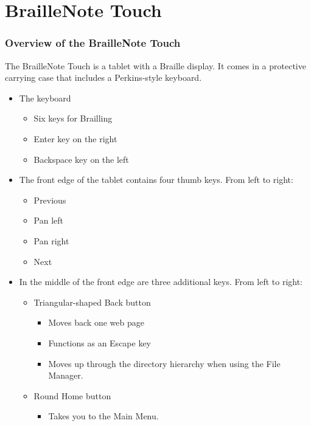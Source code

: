 \documentclass[10pt,letterpaper,twoside]{report}
\begin{document}
{{{\part{BrailleNote Touch}

\section{Overview of the BrailleNote Touch}

The BrailleNote Touch is a tablet with a Braille display. It comes in a protective carrying case that includes a Perkins-style keyboard.
\begin{itemize}
	\item The keyboard
	\begin{itemize}
		\item Six keys for Brailling
		\item Enter key on the right
		\item Backspace key on the left
	\end{itemize}
	\item The front edge of the tablet contains four thumb keys. From left to right:
	\begin{itemize}
		\item Previous
		\item Pan left
		\item Pan right
		\item Next
	\end{itemize}	
	\item In the middle of the front edge are three additional keys. From left to right:
	\begin{itemize}
		\item Triangular-shaped Back button
		\begin{itemize}
			\item Moves back one web page
			\item Functions as an Escape key
			\item Moves up through the directory hierarchy when using the File Manager.
		\end{itemize}
		\item Round Home button
		\begin{itemize}
		\item 	Takes you to the Main Menu. 

\end{itemize}
\end{itemize}
\end{itemize}}}}
\end{document}
